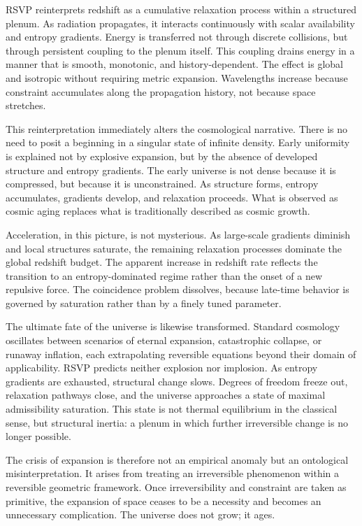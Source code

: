 \documentclass[11pt,oneside]{book}
\begin{document}
RSVP reinterprets redshift as a cumulative relaxation process within a structured plenum. As radiation propagates, it interacts continuously with scalar availability and entropy gradients. Energy is transferred not through discrete collisions, but through persistent coupling to the plenum itself. This coupling drains energy in a manner that is smooth, monotonic, and history-dependent. The effect is global and isotropic without requiring metric expansion. Wavelengths increase because constraint accumulates along the propagation history, not because space stretches.

This reinterpretation immediately alters the cosmological narrative. There is no need to posit a beginning in a singular state of infinite density. Early uniformity is explained not by explosive expansion, but by the absence of developed structure and entropy gradients. The early universe is not dense because it is compressed, but because it is unconstrained. As structure forms, entropy accumulates, gradients develop, and relaxation proceeds. What is observed as cosmic aging replaces what is traditionally described as cosmic growth.

Acceleration, in this picture, is not mysterious. As large-scale gradients diminish and local structures saturate, the remaining relaxation processes dominate the global redshift budget. The apparent increase in redshift rate reflects the transition to an entropy-dominated regime rather than the onset of a new repulsive force. The coincidence problem dissolves, because late-time behavior is governed by saturation rather than by a finely tuned parameter.

The ultimate fate of the universe is likewise transformed. Standard cosmology oscillates between scenarios of eternal expansion, catastrophic collapse, or runaway inflation, each extrapolating reversible equations beyond their domain of applicability. RSVP predicts neither explosion nor implosion. As entropy gradients are exhausted, structural change slows. Degrees of freedom freeze out, relaxation pathways close, and the universe approaches a state of maximal admissibility saturation. This state is not thermal equilibrium in the classical sense, but structural inertia: a plenum in which further irreversible change is no longer possible.

The crisis of expansion is therefore not an empirical anomaly but an ontological misinterpretation. It arises from treating an irreversible phenomenon within a reversible geometric framework. Once irreversibility and constraint are taken as primitive, the expansion of space ceases to be a necessity and becomes an unnecessary complication. The universe does not grow; it ages.
\end{document}
